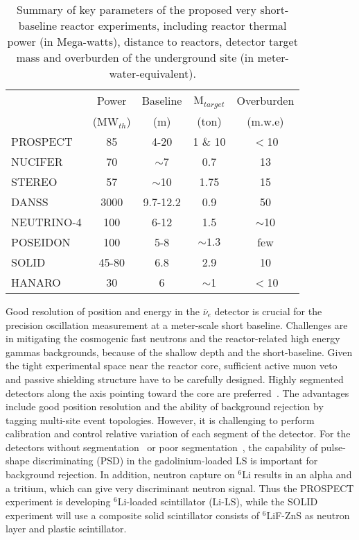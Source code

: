 \begin{table}[t]
  \begin{tabular}{lcccc}
  \hline
  & Power & Baseline & M$_{target}$ & Overburden \\
  & (MW$_{th}$) & (m) & (ton) & (m.w.e)    \\
  \hline
  PROSPECT  & 85  & 4-20 & 1 \& 10     & $<$10 \\
  NUCIFER   & 70 & $\sim$7  & 0.7 & 13\\
  STEREO & 57  & $\sim$10 & 1.75  & 15\\
  DANSS & 3000  & 9.7-12.2  & 0.9  & 50\\
  NEUTRINO-4 & 100  & 6-12  & 1.5  & $\sim$10 \\
  POSEIDON & 100  & 5-8  & $\sim1.3$ & few\\
  SOLID & 45-80 & 6.8  & 2.9  & 10\\
  HANARO & 30  & 6  & $\sim$1  & $<$10\\
  \hline
  \end{tabular}
  \caption{Summary of key parameters of the proposed very short-baseline reactor experiments, including reactor thermal power (in Mega-watts), distance to reactors, detector target mass and overburden of the underground site (in meter-water-equivalent).}
\label{tab:sterile}
\end{table}

Good resolution of position and energy in the $\bar\nu_e$ detector is 
crucial for the precision oscillation measurement at a meter-scale short baseline. Challenges 
are in mitigating the cosmogenic fast neutrons and the reactor-related high energy gammas backgrounds, because of the shallow depth and the short-baseline. Given the tight experimental space near the reactor core, sufficient active muon veto and passive shielding structure have to be carefully designed. Highly segmented detectors along the axis pointing toward the core are preferred~\cite{PROSPECT,DANSS,SoLid,HANARO}. The advantages include good position resolution and the ability of background rejection by tagging multi-site event topologies. However, it is challenging to perform calibration and control relative variation of each segment of the detector. For the detectors without segmentation~\cite{NUCIFER-2010,NEUTRINO4-2014,POSEIDON} or poor segmentation~\cite{NUCIFER-2014}, the capability of pulse-shape discriminating (PSD) in the gadolinium-loaded LS is important for background rejection. In addition, neutron capture on $^6$Li results in an alpha and a tritium, which can give very discriminant neutron signal. Thus the PROSPECT experiment is developing $^6$Li-loaded scintillator (Li-LS), while the SOLID experiment will use a composite solid scintillator consists of $^6$LiF-ZnS as neutron layer and plastic scintillator.

